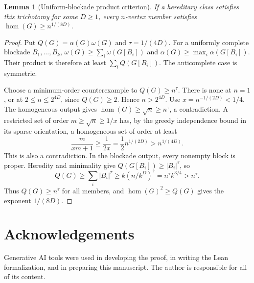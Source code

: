 \documentclass[11pt,a4paper]{article}
\newtheorem{lemma}[theorem]{Lemma}
\theoremstyle{definition}
\theoremstyle{remark}
\numberwithin{equation}{section}
\begin{document}
\begin{lemma}[Uniform-blockade product criterion]\label{lem:product}
If a hereditary class satisfies this trichotomy for some \(D\ge1\), every \(n\)-vertex member satisfies \(\hom(G)\ge n^{1/(8D)}\).
\end{lemma}
\begin{proof}
Put \(Q(G)=\alpha(G)\omega(G)\) and \(\tau=1/(4D)\). For a uniformly complete blockade \(B_1,\ldots,B_k\),
\(\omega(G)\ge\sum_i\omega(G[B_i])\) and \(\alpha(G)\ge\max_i\alpha(G[B_i])\). Their product is therefore at least \(\sum_iQ(G[B_i])\). The anticomplete case is symmetric.

Choose a minimum-order counterexample to \(Q(G)\ge n^\tau\). There is none at \(n=1\), or at \(2\le n\le2^{4D}\), since \(Q(G)\ge2\). Hence \(n>2^{4D}\). Use \(x=n^{-1/(2D)}<1/4\). The homogeneous output gives \(\hom(G)\ge\sqrt n\ge n^\tau\), a contradiction. A restricted set of order \(m\ge\sqrt n\ge1/x\) has, by the greedy independence bound in its sparse orientation, a homogeneous set of order at least
\[
 \frac{m}{xm+1}\ge\frac1{2x}=\frac12 n^{1/(2D)}>n^{1/(4D)}.
\]
This is also a contradiction. In the blockade output, every nonempty block is proper. Heredity and minimality give \(Q(G[B_i])\ge|B_i|^\tau\), so
\[
 Q(G)\ge\sum_i |B_i|^\tau
 \ge k(n/k^D)^\tau=n^\tau k^{3/4}>n^\tau.
\]
Thus \(Q(G)\ge n^\tau\) for all members, and \(\hom(G)^2\ge Q(G)\) gives the exponent \(1/(8D)\).
\end{proof}

\section*{Acknowledgements}
Generative AI tools were used in developing the proof, in writing the Lean formalization, and in preparing this manuscript. The author is responsible for all of its content.
\end{document}
